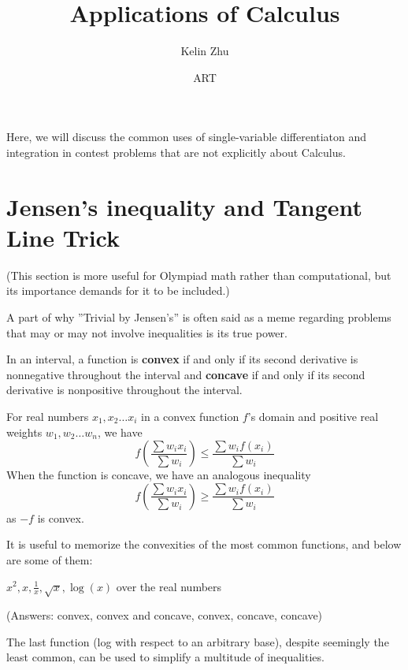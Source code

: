 \documentclass[mast]{lucky}
\title{Applications of Calculus}
\author{Kelin Zhu}
\date{ART}
\begin{document}
\maketitle
Here, we will discuss the common uses of single-variable differentiaton and integration in contest problems that are not explicitly about Calculus.
\section{Jensen's inequality and Tangent Line Trick}
(This section is more useful for Olympiad math rather than computational, but its importance demands for it to be included.)

A part of why ''Trivial by Jensen's'' is often said as a meme regarding problems that may or may not involve inequalities is its true power.
\begin{theo}
In an interval, a function is \textbf{convex} if and only if its second derivative is nonnegative throughout the interval and \textbf{concave} if and only if its second derivative is nonpositive throughout the interval.

For real numbers $x_1,x_2\ldots x_i$ in a convex function $f$'s domain and positive real weights $w_1,w_2\ldots w_n$, we have
$$f\left(\frac{\sum w_i x_i}{\sum w_i}\right)\le \frac{\sum w_i f(x_i)}{\sum w_i}$$
When the function is concave, we have an analogous inequality
$$f\left(\frac{\sum w_i x_i}{\sum w_i}\right)\ge \frac{\sum w_i f(x_i)}{\sum w_i}$$
as $-f$ is convex.
\end{theo}

It is useful to memorize the convexities of the most common functions, and below are some of them:
\begin{exer}
$x^2, x, \frac{1}{x}, \sqrt{x}, \log(x)$ over the real numbers

(Answers: convex, convex and concave, convex, concave, concave)
\end{exer}

The last function (log with respect to an arbitrary base), despite seemingly the least common, can be used to simplify a multitude of inequalities.
\end{document}
